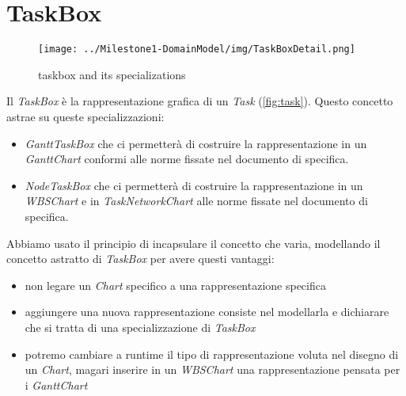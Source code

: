 \section{TaskBox}
\label{sec:taskbox}

\begin{figure}[h!] 
	\centering
	\texttt{[image: ../Milestone1-DomainModel/img/TaskBoxDetail.png]}
	\caption{taskbox and its specializations}
	\label{fig:taskbox} 
\end{figure}

Il \emph{TaskBox} \`e la rappresentazione grafica di un
\emph{Task} (\autoref{fig:task}). Questo concetto astrae su queste
specializzazioni:
\begin{itemize}
\item \emph{GanttTaskBox} che ci permetter\`a di costruire la rappresentazione
in un \emph{GanttChart} conformi alle norme fissate nel documento di specifica.

\item \emph{NodeTaskBox} che ci permetter\`a di costruire la rappresentazione
in un \emph{WBSChart} e in \emph{TaskNetworkChart} alle norme fissate nel 
documento di specifica.
\end{itemize}

Abbiamo usato il principio di incapsulare il concetto che varia, modellando il
concetto astratto di \emph{TaskBox} per avere questi vantaggi:
\begin{itemize}
  \item non legare un \emph{Chart} specifico a una rappresentazione specifica
  \item aggiungere una nuova rappresentazione consiste nel modellarla e
  dichiarare che si tratta di una specializzazione di \emph{TaskBox}
  \item potremo cambiare a runtime il tipo di rappresentazione voluta nel
  disegno di un \emph{Chart}, magari inserire in un \emph{WBSChart} una
  rappresentazione pensata per i \emph{GanttChart}
\end{itemize}